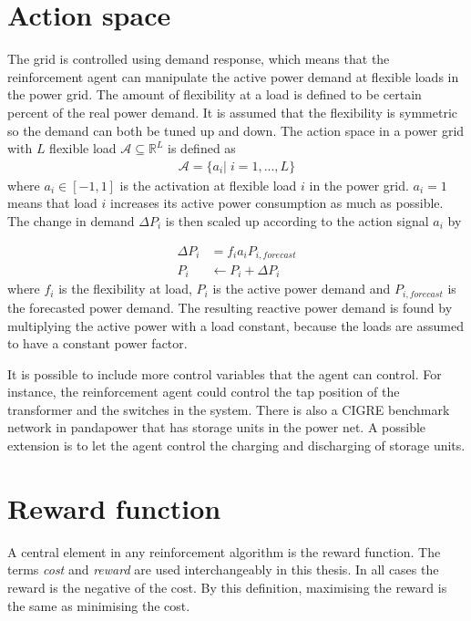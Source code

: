\documentclass[class=book, crop=false]{standalone}
\begin{document}
\section{Action space}
The grid is controlled using demand response, which means that the reinforcement agent can manipulate the active power demand at flexible loads in the power grid. The amount of flexibility at a load is defined to be certain percent of the real power demand. It is assumed that the flexibility is symmetric so the demand can both be tuned up and down. The action space in a power grid with $L$ flexible load  $\mathcal{A}  \subseteq \mathbb{R}^{L}$ is defined as
\begin{equation}
   \begin{aligned}
   \label{eq:problem:action_space}
\mathcal{A}= \{a_{i} | \;i = 1,...,L\}
    \end{aligned} 
\end{equation}
where $a_{i} \in [-1,1]$ is the activation at flexible load $i$ in the power grid. $a_{i} = 1$ means that load $i$ increases its active power consumption as much as possible. The change in demand $\Delta P_{i}$ is then scaled up according to the action signal $a_{i}$ by

\begin{equation}
   \begin{aligned}
   \label{eq:problem:update_demand}
    \Delta P_{i}& = f_{i}a_{i}P_{i,forecast} \\
    P_{i}& \leftarrow P_{i} + \Delta P_{i}
    \end{aligned} 
\end{equation}
where $f_{i}$ is the flexibility at load, $P_{i}$ is the active power demand and $P_{i,forecast}$ is the forecasted power demand. The resulting reactive power demand is found by multiplying the active power with a load constant, because the loads are assumed to have a constant power factor.

It is possible to include more control variables that the agent can control. For instance, the reinforcement agent could control the tap position of the transformer and the switches in the system. There is also a CIGRE benchmark network in pandapower that has storage units in the power net. A possible extension is to let the agent control the charging and discharging of storage units.

\section{Reward function}\label{section:reward}
A central element in any reinforcement algorithm is the reward function. The terms \textit{cost} and \textit{reward} are used interchangeably in this thesis. In all cases the reward is the negative of the cost. By this definition, maximising the reward is the same as minimising the cost. 
\end{document}
